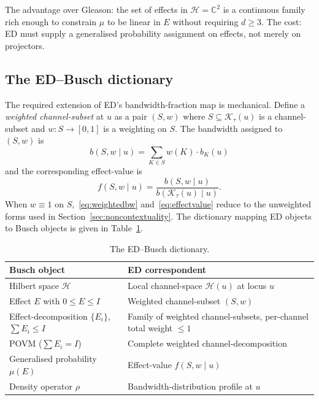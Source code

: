 \documentclass[11pt,a4paper]{article}
\begin{document}
The advantage over Gleason: the set of effects in $\mathcal{H} = \mathbb{C}^2$ is a continuous family rich enough to constrain $\mu$ to be linear in $E$ without requiring $d \geq 3$. The cost: ED must supply a generalised probability assignment on effects, not merely on projectors.

\subsection{The ED--Busch dictionary}

The required extension of ED's bandwidth-fraction map is mechanical. Define a \emph{weighted channel-subset} at $u$ as a pair $(S, w)$ where $S \subseteq \mathcal{K}_\tau(u)$ is a channel-subset and $w : S \to [0, 1]$ is a weighting on $S$. The bandwidth assigned to $(S, w)$ is
\begin{equation}
b(S, w \mid u) = \sum_{K \in S} w(K) \cdot b_K(u)
\label{eq:weightedbw}
\end{equation}
and the corresponding effect-value is
\begin{equation}
f(S, w \mid u) = \frac{b(S, w \mid u)}{b(\mathcal{K}_\tau(u) \mid u)}.
\label{eq:effectvalue}
\end{equation}
When $w \equiv 1$ on $S$,~\eqref{eq:weightedbw} and~\eqref{eq:effectvalue} reduce to the unweighted forms used in Section~\ref{sec:noncontextuality}. The dictionary mapping ED objects to Busch objects is given in Table~\ref{tab:dictionary}.

\begin{table}[h]
\centering
\begin{tabular}{ll}
\hline
Busch object & ED correspondent \\
\hline
Hilbert space $\mathcal{H}$ & Local channel-space $\mathcal{H}(u)$ at locus $u$ \\
Effect $E$ with $0 \leq E \leq I$ & Weighted channel-subset $(S, w)$ \\
Effect-decomposition $\{E_i\}$, $\sum E_i \leq I$ & Family of weighted channel-subsets, per-channel total weight $\leq 1$ \\
POVM ($\sum E_i = I$) & Complete weighted channel-decomposition \\
Generalised probability $\mu(E)$ & Effect-value $f(S, w \mid u)$ \\
Density operator $\rho$ & Bandwidth-distribution profile at $u$ \\
\hline
\end{tabular}
\caption{The ED--Busch dictionary.}
\label{tab:dictionary}
\end{table}
\end{document}
